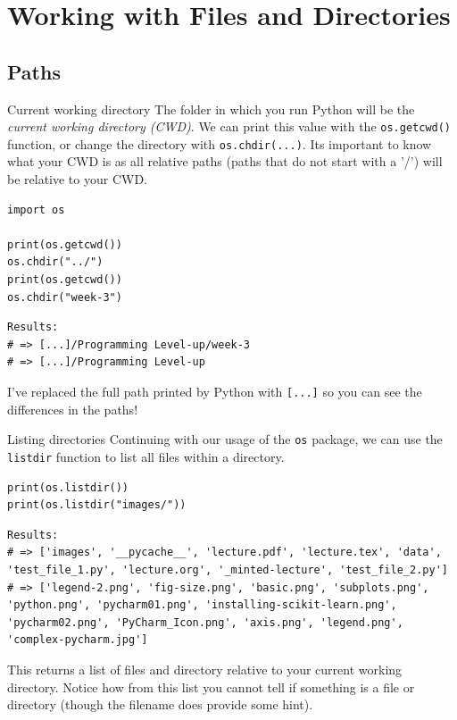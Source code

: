 \documentclass[10pt]{beamer}
\begin{document}
\section{Working with Files and Directories}
\label{sec:org8e506bd}

\subsection{Paths}
\label{sec:org4182fdf}

\begin{frame}[label={sec:org84efd6a},fragile]{Current working directory}
 The folder in which you run Python will be the \emph{current working directory (CWD)}. We can
print this value with the \texttt{os.getcwd()} function, or change the directory with
\texttt{os.chdir(...)}. Its important to know what your CWD is as all relative paths (paths
that do not start with a '/') will be relative to your CWD.

\begin{verbatim}
import os

print(os.getcwd())
os.chdir("../")
print(os.getcwd())
os.chdir("week-3")
\end{verbatim}

\begin{verbatim}
Results: 
# => [...]/Programming Level-up/week-3
# => [...]/Programming Level-up
\end{verbatim}


I've replaced the full path printed by Python with \texttt{[...]} so you can see the
differences in the paths!
\end{frame}

\begin{frame}[label={sec:orge63d75c},fragile]{Listing directories}
 Continuing with our usage of the \texttt{os} package, we can use the \texttt{listdir} function to list
all files within a directory.

\begin{verbatim}
print(os.listdir())
print(os.listdir("images/"))
\end{verbatim}

\begin{verbatim}
Results: 
# => ['images', '__pycache__', 'lecture.pdf', 'lecture.tex', 'data', 'test_file_1.py', 'lecture.org', '_minted-lecture', 'test_file_2.py']
# => ['legend-2.png', 'fig-size.png', 'basic.png', 'subplots.png', 'python.png', 'pycharm01.png', 'installing-scikit-learn.png', 'pycharm02.png', 'PyCharm_Icon.png', 'axis.png', 'legend.png', 'complex-pycharm.jpg']
\end{verbatim}


This returns a list of files and directory relative to your current working
directory. Notice how from this list you cannot tell if something is a file or
directory (though the filename does provide some hint).
\end{frame}
\end{document}

